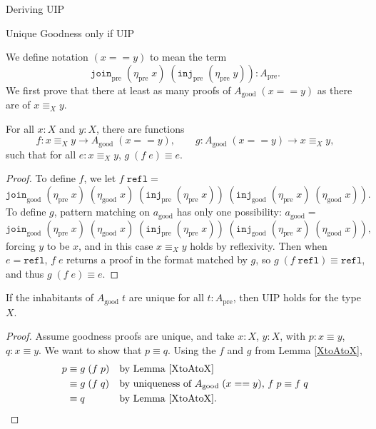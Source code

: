 \documentclass[runningheads]{llncs}
\newcommand{\pre}[1]{{#1}_\text{pre}}
\newcommand{\good}[1]{{#1}_\text{good}}
\newcommand{\Id}[2]{{#1}\equiv{#2}}
\newcommand{\IdA}[3]{{#1}\equiv_{#3}{#2}}
\newcommand{\join}{\texttt{join}}
\newcommand{\inj}{\texttt{inj}}
\newcommand{\refl}{\texttt{refl}}
\begin{document}
\begin{section}{Deriving UIP}
\begin{subsection}{Unique Goodness only if UIP}

We define notation $(x == y)$ to mean the term \[\pre{\join}\;(\pre{\eta}\;x)\;(\pre{\inj}\;(\pre{\eta}\;y)) : \pre{A}.\]
We first prove that there at least as many proofs of $\good{A}\;(x == y)$ as there are of $\IdA{x}{y}{X}$.

\begin{lemma}[$\IdA{x}{y}{X}$ is a retract of $\good{A}$]\label{XtoAtoX}
    For all $x : X$ and $y : X$, there are functions \[f : \IdA{x}{y}{X} \to \good{A}\;(x == y),\qquad g : \good{A}\;(x == y) \to \IdA{x}{y}{X},\] such that for all $e : \IdA{x}{y}{X}$, $\Id{g\;(f\;e)}{e}$.
\end{lemma}
\begin{proof}
    To define $f$, we let $f\;\refl =$ \[\good{\join}\;(\pre{\eta}\;x)\;(\good{\eta}\;x)\;(\pre{\inj}\;(\pre{\eta}\;x))\;(\good{\inj}\;(\pre{\eta}\;x)\;(\good{\eta}\;x)).\] To define $g$, pattern matching on $\good{a}$ has only one possibility: $\good{a} = $\[\good{\join}\;(\pre{\eta}\;x)\;(\good{\eta}\;x)\;(\pre{\inj}\;(\pre{\eta}\;x))\;(\good{\inj}\;(\pre{\eta}\;x)\;(\good{\eta}\;x)),\] forcing $y$ to be $x$, and in this case $\IdA{x}{y}{X}$ holds by reflexivity.
    Then when $e = \refl$, $f\;e$ returns a proof in the format matched by $g$, so $\Id{g\;(f\;\refl)}{\refl}$, and thus $\Id{g\;(f\;e)}{e}$.
\end{proof}

\begin{lemma}
    If the inhabitants of $\good{A}\;t$ are unique for all $t : \pre{A}$, then UIP holds for the type $X$.
\end{lemma}
\begin{proof}
    Assume goodness proofs are unique, and take $x : X$, $y : X$, with $p : \Id{x}{y}$, $q : \Id{x}{y}$. We want to show that $\Id{p}{q}$. Using the $f$ and $g$ from Lemma \ref{XtoAtoX}, \begin{align*}
    p &\equiv g\;(f\;p)&&\text{by Lemma \ref{XtoAtoX}}\\
      &\equiv g\;(f\;q)&&\text{by uniqueness of $\good{A}\;(x == y)$, $\Id{f\;p}{f\;q}$}\\
      &\equiv q&&\text{by Lemma \ref{XtoAtoX}}.
    \end{align*}
\end{proof}

\end{subsection}


\end{section}
\end{document}
